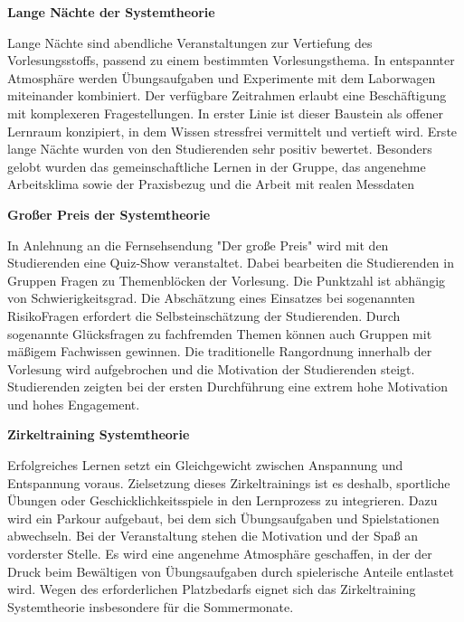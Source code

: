 {\selectfont
\noindent\textbf{Lange Nächte der Systemtheorie}} \smallskip

\noindent Lange Nächte sind abendliche Veranstaltungen zur Vertiefung des Vorlesungsstoffs, passend zu einem bestimmten Vorlesungsthema. In entspannter Atmosphäre werden Übungsaufgaben und Experimente mit dem Laborwagen miteinander kombiniert. Der verfügbare Zeitrahmen erlaubt eine Beschäftigung mit komplexeren Fragestellungen. In erster Linie ist dieser Baustein als offener Lernraum konzipiert, in dem Wissen stressfrei vermittelt und vertieft wird. Erste lange Nächte wurden von den Studierenden sehr positiv bewertet. Besonders gelobt wurden das gemeinschaftliche Lernen in der Gruppe, das angenehme Arbeitsklima sowie der Praxisbezug und die Arbeit mit realen Messdaten\bigskip

{\selectfont
\noindent\textbf{Großer Preis der Systemtheorie}} \smallskip

\noindent In Anlehnung an die Fernsehsendung "Der große Preis" wird mit den Studierenden eine Quiz-Show veranstaltet. Dabei bearbeiten die Studierenden in Gruppen Fragen zu Themenblöcken der Vorlesung. Die Punktzahl ist abhängig von Schwierigkeitsgrad. Die Abschätzung eines Einsatzes bei sogenannten RisikoFragen erfordert die Selbsteinschätzung der Studierenden. Durch sogenannte Glücksfragen zu fachfremden Themen können auch Gruppen mit mäßigem Fachwissen gewinnen. Die traditionelle Rangordnung innerhalb der Vorlesung wird aufgebrochen und die Motivation der Studierenden steigt. Studierenden zeigten bei der ersten Durchführung eine extrem hohe Motivation und hohes Engagement.\bigskip

{\selectfont
\noindent\textbf{Zirkeltraining Systemtheorie}} \smallskip

\noindent Erfolgreiches Lernen setzt ein Gleichgewicht zwischen Anspannung und Entspannung voraus. Zielsetzung dieses Zirkeltrainings ist es deshalb, sportliche Übungen oder Geschicklichkeitsspiele in den Lernprozess zu integrieren. Dazu wird ein Parkour aufgebaut, bei dem sich Übungsaufgaben und Spielstationen abwechseln. Bei der Veranstaltung stehen die Motivation und der Spaß an vorderster Stelle. Es wird eine angenehme Atmosphäre geschaffen, in der der Druck beim Bewältigen von Übungsaufgaben durch spielerische Anteile entlastet wird. Wegen des erforderlichen Platzbedarfs eignet sich das Zirkeltraining Systemtheorie insbesondere für die Sommermonate.\newline

